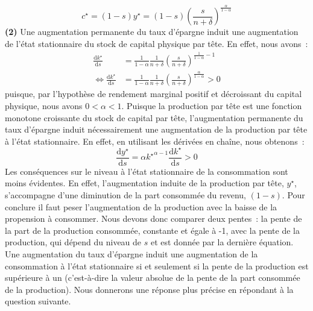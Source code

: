 \documentclass[10pt,a4paper,notitlepage]{report}
\newcommand{\question}[1]{\textbf{(#1)}}
\begin{document}
\[
c^{\star} = (1-s)y^{\star} = (1-s)\left(\frac{s}{n+\delta}\right)^{\frac{\alpha}{1-\alpha}}
\]
\question{2} Une augmentation permanente  du taux d'épargne induit une
augmentation de l'état  stationnaire du stock de  capital physique par
tête. En effet, nous avons :
\[
\begin{split}
\frac{\mathrm d k^{\star}}{\mathrm d s} &= \frac{1}{1-\alpha}\frac{1}{n+\delta}\left(\frac{s}{n+\delta}\right)^{\frac{1}{1-\alpha}-1}\\
\Leftrightarrow \frac{\mathrm d k^{\star}}{\mathrm d s} &= \frac{1}{1-\alpha}\frac{1}{n+\delta}\left(\frac{s}{n+\delta}\right)^{\frac{\alpha}{1-\alpha}} > 0
\end{split}
\]
puisque, par l'hypothèse de  rendement marginal positif et décroissant
du capital  physique, nous  avons $0<\alpha<1$. Puisque  la production
par tête est une fonction monotone  croissante du stock de capital par
tête,   l'augmentation    permanente   du   taux    d'épargne   induit
nécessairement une  augmentation de  la production  par tête  à l'état
stationnaire.  En effet,  en utilisant  les dérivées  en chaîne,  nous
obtenons :
\[
\frac{\mathrm d y^{\star}}{\mathrm d s} = \alpha \left. k^{\star} \right. ^{\alpha-1} \frac{\mathrm d k^{\star}}{\mathrm d s} > 0 
\]
Les  conséquences   sur  le  niveau   à  l'état  stationnaire   de  la
consommation sont moins évidentes. En effet, l'augmentation induite de
la production par tête,  $y^{\star}$, s'accompagne d'une diminution de
la  part consommée  du revenu,  $(1-s)$. Pour  conclure il  faut peser
l'augmentation  de la  production avec  la baisse  de la  propension à
consommer. Nous devons donc comparer deux pentes : la pente de la part
de la production consommée, constante et  égale à -1, avec la pente de
la  production, qui  dépend du  niveau  de $s$  et est  donnée par  la
dernière  équation.  Une  augmentation  du taux  d'épargne induit  une
augmentation de la consommation à  l'état stationnaire si et seulement
si la  pente de  la production  est supérieure  à un  (c'est-à-dire la
valeur   absolue  de   la   pente   de  la   part   consommée  de   la
production). Nous donnerons une réponse plus précise en répondant à la
question  suivante.\newline  
\end{document}
